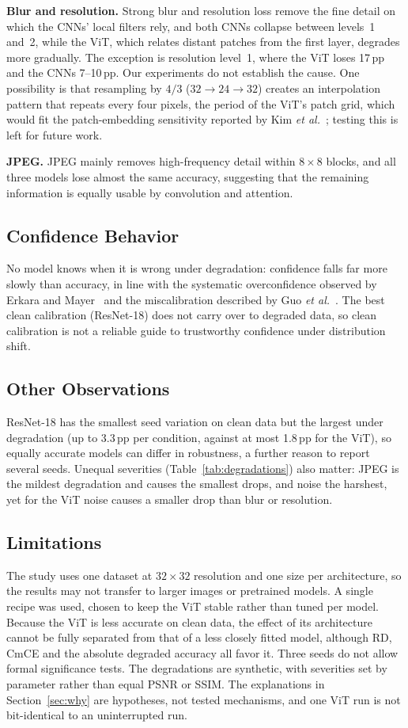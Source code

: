 \documentclass[conference]{IEEEtran}
\begin{document}
\textbf{Blur and resolution.} Strong blur and resolution loss remove the fine detail on which the CNNs' local filters rely, and both CNNs collapse between levels~1 and~2, while the ViT, which relates distant patches from the first layer, degrades more gradually. The exception is resolution level~1, where the ViT loses 17\,pp and the CNNs 7--10\,pp. Our experiments do not establish the cause. One possibility is that resampling by $4/3$ ($32 \to 24 \to 32$) creates an interpolation pattern that repeats every four pixels, the period of the ViT's patch grid, which would fit the patch-embedding sensitivity reported by Kim \emph{et al.}~\cite{kim2023}; testing this is left for future work.

\textbf{JPEG.} JPEG mainly removes high-frequency detail within $8\times8$ blocks, and all three models lose almost the same accuracy, suggesting that the remaining information is equally usable by convolution and attention.

\subsection{Confidence Behavior}
No model knows when it is wrong under degradation: confidence falls far more slowly than accuracy, in line with the systematic overconfidence observed by Erkara and Mayer~\cite{erkara2026} and the miscalibration described by Guo \emph{et al.}~\cite{guo2017}. The best clean calibration (ResNet-18) does not carry over to degraded data, so clean calibration is not a reliable guide to trustworthy confidence under distribution shift.

\subsection{Other Observations}
ResNet-18 has the smallest seed variation on clean data but the largest under degradation (up to 3.3\,pp per condition, against at most 1.8\,pp for the ViT), so equally accurate models can differ in robustness, a further reason to report several seeds. Unequal severities (Table~\ref{tab:degradations}) also matter: JPEG is the mildest degradation and causes the smallest drops, and noise the harshest, yet for the ViT noise causes a smaller drop than blur or resolution.

\subsection{Limitations}
The study uses one dataset at $32\times32$ resolution and one size per architecture, so the results may not transfer to larger images or pretrained models. A single recipe was used, chosen to keep the ViT stable rather than tuned per model. Because the ViT is less accurate on clean data, the effect of its architecture cannot be fully separated from that of a less closely fitted model, although RD, CmCE and the absolute degraded accuracy all favor it. Three seeds do not allow formal significance tests. The degradations are synthetic, with severities set by parameter rather than equal PSNR or SSIM. The explanations in Section~\ref{sec:why} are hypotheses, not tested mechanisms, and one ViT run is not bit-identical to an uninterrupted run.
\end{document}
